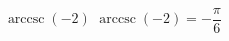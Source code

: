  {$\operatorname{arccsc} \left( -2 \right)$ }
{ $\operatorname{arccsc} \left( -2 \right) = -\dfrac{\pi}{6}$}
